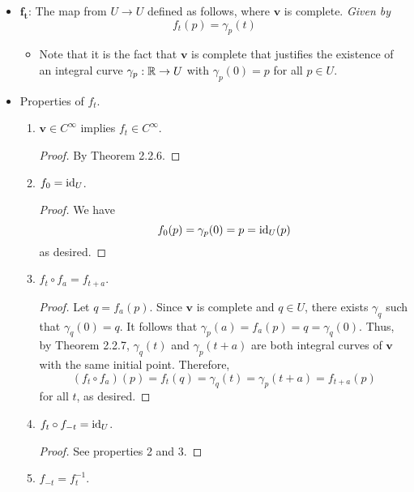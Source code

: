 \documentclass[../notes.tex]{subfiles}
\begin{document}
\begin{itemize}
\begin{itemize}
    \end{itemize}
    \item $\bm{f_t}$: The map from $U\to U$ defined as follows, where $\bm{v}$ is complete. \emph{Given by}
    \begin{equation*}
        f_t(p) = \gamma_p(t)
    \end{equation*}
    \begin{itemize}
        \item Note that it is the fact that $\bm{v}$ is complete that justifies the existence of an integral curve $\gamma_p:\mathbb{R}\to U$ with $\gamma_p(0)=p$ for all $p\in U$.
    \end{itemize}
    \item Properties of $f_t$.
    \begin{enumerate}
        \item $\bm{v}\in C^\infty$ implies $f_t\in C^\infty$.
        \begin{proof}
            By Theorem 2.2.6.
        \end{proof}
        \item $f_0=\operatorname{id}_U$.
        \begin{proof}
            We have
            \begin{equation*}
                f_0(p) = \gamma_p(0) = p = \operatorname{id}_U(p)
            \end{equation*}
            as desired.
        \end{proof}
        \item $f_t\circ f_a=f_{t+a}$.
        \begin{proof}
            Let $q=f_a(p)$. Since $\bm{v}$ is complete and $q\in U$, there exists $\gamma_q$ such that $\gamma_q(0)=q$. It follows that $\gamma_p(a)=f_a(p)=q=\gamma_q(0)$. Thus, by Theorem 2.2.7, $\gamma_q(t)$ and $\gamma_p(t+a)$ are both integral curves of $\bm{v}$ with the same initial point. Therefore,
            \begin{equation*}
                (f_t\circ f_a)(p) = f_t(q)
                = \gamma_q(t)
                = \gamma_p(t+a)
                = f_{t+a}(p)
            \end{equation*}
            for all $t$, as desired.
        \end{proof}
        \item $f_t\circ f_{-t}=\operatorname{id}_U$.
        \begin{proof}
            See properties 2 and 3.
        \end{proof}
        \item $f_{-t}=f_t^{-1}$.

\end{enumerate}
\end{itemize}
\end{document}
